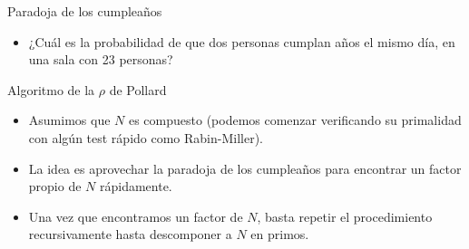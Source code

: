 \documentclass{beamer}
\begin{document}
\begin{frame}{Paradoja de los cumpleaños}
    \begin{itemize}
      \item ¿Cuál es la probabilidad de que dos personas cumplan años el mismo día, en una sala con 23 personas?
      \pause
    \end{itemize}
\end{frame}


\begin{frame}{Algoritmo de la $\rho$ de Pollard}
    \begin{itemize}
      \item Asumimos que $N$ es compuesto (podemos comenzar verificando su primalidad con algún test rápido como Rabin-Miller).
      \item La idea es aprovechar la paradoja de los cumpleaños para encontrar un factor propio de $N$ rápidamente.
      \item Una vez que encontramos un factor de $N$, basta repetir el procedimiento recursivamente hasta descomponer a $N$ en primos.
    \end{itemize}
\end{frame}
\end{document}
